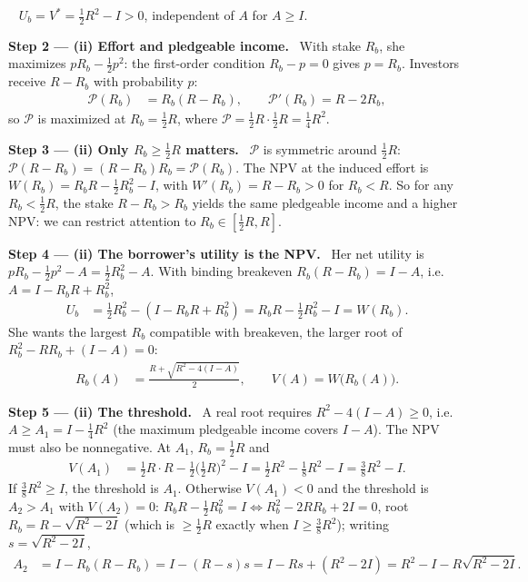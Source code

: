 \documentclass[11pt,a4paper]{article}
\newcommand{\step}[2]{\par\medskip\noindent\textbf{Step #1 --- #2.}~}
\newcommand{\answer}[1]{\par\smallskip\noindent\fbox{\textbf{Answer #1.}}~}
\begin{document}
\answer{(i)} $U_b=V^*=\tfrac12R^2-I>0$, independent of $A$ for $A\ge I$.

\step{2}{(ii) Effort and pledgeable income} With stake $R_b$, she maximizes $pR_b-\tfrac12p^2$:
the first-order condition $R_b-p=0$ gives $p=R_b$. Investors receive $R-R_b$ with probability $p$:
\begin{align}
  \mathcal P(R_b) &= R_b(R-R_b), \qquad \mathcal P'(R_b)=R-2R_b, \label{r4e14-P}
\end{align}
so $\mathcal P$ is maximized at $R_b=\tfrac12R$, where $\mathcal P=\tfrac12R\cdot\tfrac12R=\tfrac14R^2$.

\step{3}{(ii) Only $R_b\ge\tfrac12R$ matters} $\mathcal P$ is symmetric around $\tfrac12R$:
$\mathcal P(R-R_b)=(R-R_b)R_b=\mathcal P(R_b)$. The NPV at the induced effort is
$W(R_b)=R_bR-\tfrac12R_b^2-I$, with $W'(R_b)=R-R_b>0$ for $R_b<R$. So for any $R_b<\tfrac12R$, the
stake $R-R_b>R_b$ yields the same pledgeable income and a higher NPV: we can restrict attention
to $R_b\in[\tfrac12R,R]$.

\step{4}{(ii) The borrower's utility is the NPV} Her net utility is $pR_b-\tfrac12p^2-A=\tfrac12R_b^2-A$.
With binding breakeven $R_b(R-R_b)=I-A$, i.e.\ $A=I-R_bR+R_b^2$,
\begin{align}
  U_b &= \tfrac12R_b^2-(I-R_bR+R_b^2) = R_bR-\tfrac12R_b^2-I = W(R_b). \nonumber
\end{align}
She wants the largest $R_b$ compatible with breakeven, the larger root of
$R_b^2-RR_b+(I-A)=0$:
\begin{align}
  R_b(A) &= \frac{R+\sqrt{R^2-4(I-A)}}{2}, \qquad V(A)=W\big(R_b(A)\big). \label{r4e14-Rb}
\end{align}

\step{5}{(ii) The threshold} A real root requires $R^2-4(I-A)\ge 0$, i.e.\
$A\ge A_1=I-\tfrac14R^2$ (the maximum pledgeable income covers $I-A$). The NPV must also be
nonnegative. At $A_1$, $R_b=\tfrac12R$ and
\begin{align}
  V(A_1) &= \tfrac12R\cdot R-\tfrac12\big(\tfrac12R\big)^2-I = \tfrac12R^2-\tfrac18R^2-I = \tfrac38R^2-I. \nonumber
\end{align}
If $\tfrac38R^2\ge I$, the threshold is $A_1$. Otherwise $V(A_1)<0$ and the threshold is $A_2>A_1$
with $V(A_2)=0$: $R_bR-\tfrac12R_b^2=I\iff R_b^2-2RR_b+2I=0$, root $R_b=R-\sqrt{R^2-2I}$ (which is
$\ge\tfrac12R$ exactly when $I\ge\tfrac38R^2$); writing $s=\sqrt{R^2-2I}$,
\begin{align}
  A_2 &= I-R_b(R-R_b) = I-(R-s)s = I-Rs+(R^2-2I) = R^2-I-R\sqrt{R^2-2I}. \nonumber
\end{align}
\end{document}
